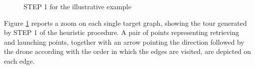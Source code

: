 \begin{figure}[h!]
    \centering
    \qquad
     \qquad
    \qquad
    \caption{STEP 1 for the illustrative example}%
    \label{fig:example2}%
\end{figure}

\noindent
Figure \ref{fig:example2} reports a zoom on each single target graph, showing the tour generated by STEP 1 of the heuristic procedure. A pair of points representing retrieving and launching points,  together with an arrow pointing the direction followed by the drone according with the order in which the edges are visited, are depicted on each edge.

